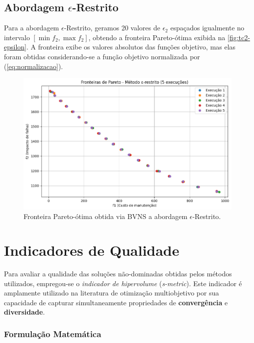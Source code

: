 \documentclass[
	12pt,				%
	oneside,			%
	a4paper,			%
	chapter=TITLE,
	sumario=tradicional,
	english,			%
	brazil				%
]{abntex2}
\begin{document}
\section{Abordagem $\epsilon$-Restrito}

Para a abordagem $\epsilon$-Restrito, geramos 20 valores de 
$\epsilon_2$ espaçados igualmente no intervalo $\left[ \min f_2 , \max f_2 \right]$,
obtendo a fronteira Pareto-ótima exibida na \autoref{fig:tc2-epsilon}.
A fronteira exibe os valores absolutos das funções objetivo, mas 
elas foram obtidas considerando-se a função objetivo normalizada por 
(\ref{eq:normalizacao}).

\begin{figure}[h!]
	\caption{\label{fig:tc2-epsilon}Fronteira Pareto-ótima obtida via BVNS a 
	abordagem $\epsilon$-Restrito.}
	\begin{center}
    \includegraphics[width=\textwidth,trim=1 1 1 1,clip]{tc2-epsilon.png}
	\end{center}
\end{figure}


\chapter{Indicadores de Qualidade}\label{cap:analise} 

Para avaliar a qualidade das soluções não-dominadas obtidas pelos métodos utilizados, empregou-se o
\textit{indicador de hipervolume} (\textit{s-metric}). Este indicador é amplamente utilizado na literatura de otimização multiobjetivo
por sua capacidade de capturar simultaneamente propriedades de \textbf{convergência} e \textbf{diversidade}.

\subsection{Formulação Matemática}
\end{document}
